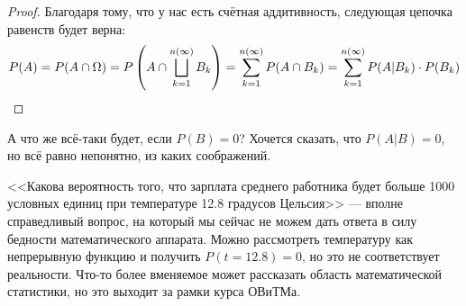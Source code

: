 \begin{proof}
	Благодаря тому, что у нас есть счётная аддитивность, следующая цепочка равенств будет верна:
	\[
		P(A) = P(A \cap \Omega) = P\left(A \cap \bigsqcup_{k = 1}^{n(\infty)} B_k\right) = \sum_{k = 1}^{n(\infty)} P(A \cap B_k) = \sum_{k = 1}^{n(\infty)} P(A|B_k) \cdot P(B_k)
	\]
\end{proof}

\begin{note}
	А что же всё-таки будет, если $P(B) = 0$? Хочется сказать, что $P(A|B) = 0$, но всё равно непонятно, из каких соображений.
\end{note}

\begin{example}
	<<Какова вероятность того, что зарплата среднего работника будет больше 1000 условных единиц при температуре 12.8 градусов Цельсия>> --- вполне справедливый вопрос, на который мы сейчас не можем дать ответа в силу бедности математического аппарата. Можно рассмотреть температуру как непрерывную функцию и получить $P(t = 12.8) = 0$, но это не соответствует реальности. Что-то более вменяемое может рассказать область математической статистики, но это выходит за рамки курса ОВиТМа.
\end{example}